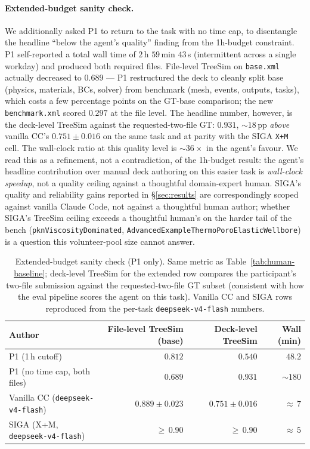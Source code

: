 \documentclass{article}
\begin{document}
\paragraph{Extended-budget sanity check.} We additionally asked P1 to return to the task with no time cap, to disentangle the headline ``below the agent's quality'' finding from the 1h-budget constraint. P1 self-reported a total wall time of $2\,$h $59\,$min $43\,$s (intermittent across a single workday) and produced both required files. File-level TreeSim on \texttt{base.xml} actually decreased to $0.689$ --- P1 restructured the deck to cleanly split base (physics, materials, BCs, solver) from benchmark (mesh, events, outputs, tasks), which costs a few percentage points on the GT-base comparison; the new \texttt{benchmark.xml} scored $0.297$ at the file level. The headline number, however, is the deck-level TreeSim against the requested-two-file GT: $\mathbf{0.931}$, $\sim\!18\,$pp \emph{above} vanilla CC's $0.751 \pm 0.016$ on the same task and at parity with the SIGA \texttt{X+M} cell. The wall-clock ratio at this quality level is ${\sim}36\times$ in the agent's favour. We read this as a refinement, not a contradiction, of the 1h-budget result: the agent's headline contribution over manual deck authoring on this easier task is \emph{wall-clock speedup}, not a quality ceiling against a thoughtful domain-expert human. SIGA's quality and reliability gains reported in \S\ref{sec:results} are correspondingly scoped against vanilla Claude Code, not against a thoughtful human author; whether SIGA's TreeSim ceiling exceeds a thoughtful human's on the harder tail of the bench (\texttt{pknViscosityDominated}, \texttt{AdvancedExampleThermoPoroElasticWellbore}) is a question this volunteer-pool size cannot answer.

\begin{table}[h]
  \caption{Extended-budget sanity check (P1 only). Same metric as Table~\ref{tab:human-baseline}; deck-level TreeSim for the extended row compares the participant's two-file submission against the requested-two-file GT subset (consistent with how the eval pipeline scores the agent on this task). Vanilla CC and SIGA rows reproduced from the per-task \texttt{deepseek-v4-flash} numbers.}
  \label{tab:human-baseline-extended}
  \centering
  \small
  \begin{tabular}{lrrr}
    \toprule
    \textbf{Author} & \textbf{File-level TreeSim (base)} & \textbf{Deck-level TreeSim} & \textbf{Wall (min)} \\
    \midrule
    P1 (1\,h cutoff)                           & $0.812$            & $0.540$            & $48.2$ \\
    P1 (no time cap, both files)               & $0.689$            & $0.931$            & ${\sim}180$ \\
    Vanilla CC (\texttt{deepseek-v4-flash})    & $0.889 \pm 0.023$  & $0.751 \pm 0.016$  & ${\approx}\,7$ \\
    SIGA (X+M, \texttt{deepseek-v4-flash})     & ${\geq}\,0.90$     & ${\geq}\,0.90$     & ${\approx}\,5$ \\
    \bottomrule
  \end{tabular}
\end{table}
\end{document}
